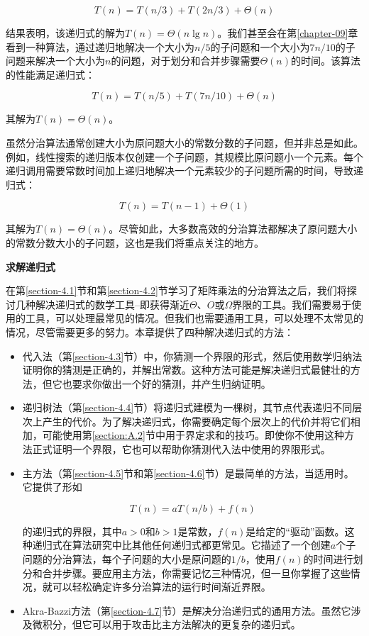 \documentclass[lang=cn,newtx,10pt,scheme=chinese]{elegantbook}
\begin{document}
$$
T(n)=T(n / 3)+T(2 n / 3)+\Theta(n)
$$

结果表明，该递归式的解为$T(n)=\Theta(n \lg n)$。我们甚至会在第\ref{chapter-09}章看到一种算法，通过递归地解决一个大小为$n/5$的子问题和一个大小为$7n/10$的子问题来解决一个大小为$n$的问题，对于划分和合并步骤需要$\Theta(n)$的时间。该算法的性能满足递归式：

$$
T(n)=T(n / 5)+T(7 n / 10)+\Theta(n)
$$

其解为$T(n)=\Theta(n)$。

虽然分治算法通常创建大小为原问题大小的常数分数的子问题，但并非总是如此。例如，线性搜索的递归版本仅创建一个子问题，其规模比原问题小一个元素。每个递归调用需要常数时间加上递归地解决一个元素较少的子问题所需的时间，导致递归式：

$$
T(n)=T(n-1)+\Theta(1)
$$

其解为$T(n)=\Theta(n)$。尽管如此，大多数高效的分治算法都解决了原问题大小的常数分数大小的子问题，这也是我们将重点关注的地方。

\textbf{求解递归式}

在第\ref{section-4.1}节和第\ref{section-4.2}节学习了矩阵乘法的分治算法之后，我们将探讨几种解决递归式的数学工具--即获得渐近$\Theta$、$O$或$\Omega$界限的工具。我们需要易于使用的工具，可以处理最常见的情况。但我们也需要通用工具，可以处理不太常见的情况，尽管需要更多的努力。本章提供了四种解决递归式的方法：

\begin{itemize}
\item 代入法（第\ref{section-4.3}节）中，你猜测一个界限的形式，然后使用数学归纳法证明你的猜测是正确的，并解出常数。这种方法可能是解决递归式最健壮的方法，但它也要求你做出一个好的猜测，并产生归纳证明。
\item 递归树法（第\ref{section-4.4}节）将递归式建模为一棵树，其节点代表递归不同层次上产生的代价。为了解决递归式，你需要确定每个层次上的代价并将它们相加，可能使用第\ref{section:A.2}节中用于界定求和的技巧。即使你不使用这种方法正式证明一个界限，它也可以帮助你猜测代入法中使用的界限形式。
\item 主方法（第\ref{section-4.5}节和第\ref{section-4.6}节）是最简单的方法，当适用时。它提供了形如

$$
T(n)=a T(n / b)+f(n)
$$

的递归式的界限，其中$a>0$和$b>1$是常数，$f(n)$是给定的“驱动”函数。这种递归式在算法研究中比其他任何递归式都更常见。它描述了一个创建$a$个子问题的分治算法，每个子问题的大小是原问题的$1/b$，使用$f(n)$的时间进行划分和合并步骤。要应用主方法，你需要记忆三种情况，但一旦你掌握了这些情况，就可以轻松确定许多分治算法的运行时间渐近界限。
\item Akra-Bazzi方法（第\ref{section-4.7}节）是解决分治递归式的通用方法。虽然它涉及微积分，但它可以用于攻击比主方法解决的更复杂的递归式。
\end{itemize}
\end{document}
